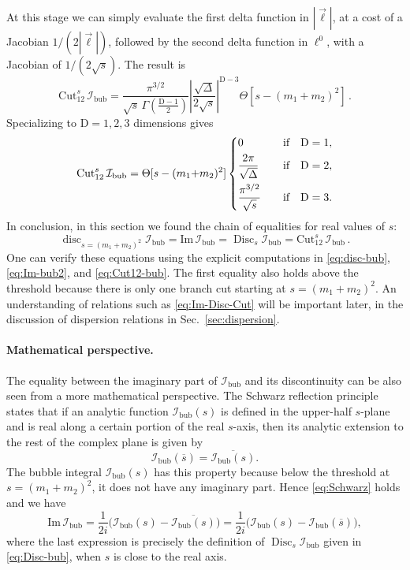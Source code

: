\documentclass[12pt]{article}
\numberwithin{figure}{section}
\DeclareMathOperator{\Disc}{Disc}
\DeclareMathOperator{\disc}{disc}
\def \be {\begin{equation}}
\def \ee {\end{equation}}
\def \D {\mathrm{D}}
\def \I {\mathcal{I}}
\def \Im {\mathrm{Im}}
\def \bubble {\mathrm{bub}}
\def \Cut {\mathrm{Cut}}
\begin{document}
	At this stage we can simply evaluate the first delta function in $|\vec{\ell}|$, at a cost of a Jacobian $1/(2 |\vec{\ell}|)$, followed by the second delta function in $\ell^0$, with a Jacobian of $1/(2 \sqrt{s})$. The result is
	\be 
	    \Cut_{12}^s\, \I_{\bubble} =
	    \frac{\pi^{3/2}}{\sqrt{s} \, \Gamma(\tfrac{\D-1}{2})}  \left\vert \frac{\sqrt{\Delta}}{2\sqrt{s}} \right\vert^{\D -3 } \! \Theta[s - (m_1 {+} m_2)^2] \,.
	\ee 
	Specializing to $\D=1,2,3$ dimensions gives
	\be \label{eq:Cut12-bub}
	    \Cut_{12}^s\, \I_{\bubble} =
	    \Theta[s - (m_1 {+} m_2)^2]\begin{dcases}
	    0 \quad&\text{if}\quad \D=1,\\
		\frac{2\pi}{\sqrt{\Delta}} \quad&\text{if}\quad \D=2,\\
		\frac{\pi^{3/2}}{\sqrt{s}} \quad&\text{if}\quad \D=3.\\
	\end{dcases}
	\ee 
	In conclusion, in this section we found the chain of equalities for real values of $s$:
	\be\label{eq:Im-Disc-Cut}
	\disc_{s = (m_1+m_2)^2} \I_{\bubble} = \Im\, \I_{\bubble} = \Disc_s \I_{\bubble} = \Cut_{12}^s\, \I_{\bubble} \,.
	\ee
	One can verify these equations using the explicit computations in \eqref{eq:disc-bub}, \eqref{eq:Im-bub2}, and \eqref{eq:Cut12-bub}.
	The first equality also holds above the threshold because there is only one branch cut starting at $s=(m_1+m_2)^2$. An understanding of relations such as \eqref{eq:Im-Disc-Cut} will be important later, in the discussion of dispersion relations in Sec.~\ref{sec:dispersion}.
	
	\paragraph{Mathematical perspective.}
	The equality between the imaginary part of $\I_\bubble$ and its discontinuity can be also seen from a more mathematical perspective. The Schwarz reflection principle states that if an analytic function $\I_\bubble(s)$ is defined in the upper-half $s$-plane and is real along a certain portion of the real $s$-axis, then its analytic extension to the rest of the complex plane is given by
	\be\label{eq:Schwarz}
	\I_\bubble(\overline{s}) = \overline{\I_\bubble(s)} .
	\ee
	The bubble integral $\I_\bubble(s)$ has this property because below the threshold at $s=(m_1+m_2)^2$, it does not have any imaginary part. Hence \eqref{eq:Schwarz} holds and we have
	\be
	\Im\, \I_\bubble = \frac{1}{2i}\Big( \I_\bubble(s) - \overline{\I_\bubble(s)} \Big) = \frac{1}{2i}\Big( \I_\bubble(s) - \I_\bubble(\overline{s}) \Big),
	\ee
	where the last expression is precisely the definition of $\Disc_s \I_\bubble$ given in \eqref{eq:Disc-bub}, when $s$ is close to the real axis.
	
\end{document}
